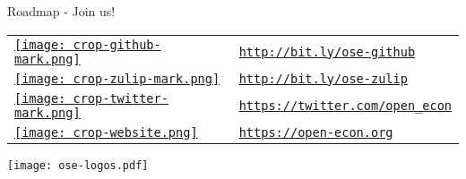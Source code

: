\begin{frame}{Roadmap - Join us!}
\begin{multicols}{2}
	
	\begin{table}[]
		\begin{tabularx}{1\textwidth}{>{\centering\arraybackslash}m{1.5cm} >{\centering\arraybackslash}m{3.7cm}}
			\href{http://bit.ly/ose-github}{\texttt{[image: crop-github-mark.png]}} &
			\href{http://bit.ly/ose-github}{\texttt{http://bit.ly/ose-github}} \\[1cm]
			
			\href{http://bit.ly/ose-zulip}{\texttt{[image: crop-zulip-mark.png]}} &
			\href{http://bit.ly/ose-zulip}{\texttt{http://bit.ly/ose-zulip}}    \\[0.8cm]
			
			\href{https://twitter.com/open_econ}{\texttt{[image: crop-twitter-mark.png]}} &
			\href{https://twitter.com/open_econ}{\texttt{https://twitter.com/open\_econ}} \\[0.8cm]
			
			\href{https://open-econ.org}{\texttt{[image: crop-website.png]}} & \href{https://open-econ.org}{\texttt{https://open-econ.org}}
		\end{tabularx}
	\end{table}
	
	\columnbreak
	
	\hspace{2.5cm}\texttt{[image: ose-logos.pdf]}
	
\end{multicols}
\end{frame}
